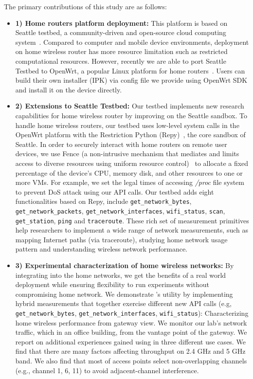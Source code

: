 The primary contributions of this study are as follows:
{\raggedright
\begin{itemize}
\item\textbf{1) Home routers platform deployment:} This platform is based on Seattle testbed, a community-driven and open-source cloud computing system~\cite{zhuang2013experience,cappos2009seattle}. Compared to computer and mobile device environments, deployment on home wireless router has more resource limitation such as restricted computational resources. However, recently we are able to port Seattle Testbed to OpenWrt, a popular Linux platform for home routers~\cite{openwrt}. Users can build their own \sysname installer (IPK) via config file we provide using OpenWrt SDK and install it on the device directly. 

\item\textbf{2) Extensions to Seattle Testbed:} Our testbed implements new research capabilities for home wireless router by improving on the Seattle sandbox. To handle home wireless routers, our testbed uses low-level system calls in the OpenWrt platform with the Restriction Python (Repy)~\cite{cappos2010retaining}, the core sandbox of Seattle. In order to securely interact with home routers on remote user devices, we use Fence (a non-intrusive mechanism that mediates and limits access to diverse resources using uniform resource control)~\cite{li2015fence} to allocate a fixed percentage of the device's CPU, memory disk, and other resources to one or more VMs. For example, we set the legal times of accessing \emph{/proc} file system to prevent DoS attack using our API calls. Our testbed adds eight functionalities based on Repy, include \texttt{get\_network\_bytes}, \texttt{get\_network\_packets}, \texttt{get\_network\_interfaces}, \texttt{wifi\_status}, \texttt{scan}, \texttt{get\_station}, \texttt{ping} and \texttt{traceroute}. These rich set of measurement primitives help researchers to implement a wide range of network measurements, such as mapping Internet paths (via traceroute), studying home network usage pattern and understanding wireless network performance.

\item\textbf{3) Experimental characterization of home wireless networks:} By integrating \sysname into the home networks, we get the benefits of a real world deployment while ensuring flexibility to run experiments without compromising home network. We demonstrate \sysname's utility by implementing hybrid measurements that together exercise different new API calls (e.g, \texttt{get\_network\_bytes}, \texttt{get\_network\_interfaces}, \texttt{wifi\_status}): Characterizing home wireless performance from gateway view. We monitor our lab's network traffic, which in an office building, from the vantage point of the gateway. We report on additional experiences gained using \sysname in three different use cases. We find that there are many factors affecting throughput on 2.4 GHz and 5 GHz band. We also find that most of access points select non-overlapping channels (e.g., channel 1, 6, 11) to avoid adjacent-channel interference. 
\end{itemize}
\par}
